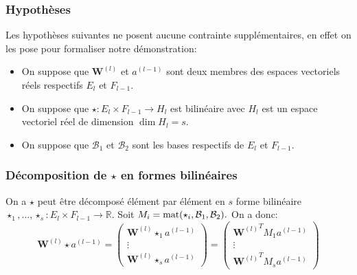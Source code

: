 \subsubsection{Hypothèses}
Les hypothèses suivantes ne posent aucune contrainte supplémentaires, en effet on les pose pour formaliser notre démonstration:
\begin{itemize}
\item On suppose que $\boldsymbol{W}^{(l)}$ et $a^{(l-1)}$ sont deux membres des espaces vectoriels réels respectifs $E_l$ et $F_{l-1}.$
\item On suppose que $\star : E_l\times F_{l-1}\rightarrow H_l$ est bilinéaire avec $H_l$ est un espace vectoriel réel de dimension $\dim H_l=s$.
\item On suppose que $\mathcal{B}_1$ et $\mathcal{B}_2$ sont les bases respectifs de  $E_l$ et $F_{l-1}.$
\end{itemize}
\subsubsection{Décomposition de $\star$ en formes bilinéaires}
On a $\star$ peut être décomposé élément par élément en $s$ forme bilinéaire $\star_1,\dots,\star_s:E_l\times F_{l-1} \rightarrow \mathbb{R}.$
\newline Soit $M_i=\operatorname{mat}(\star_i,\mathcal{B}_1,\mathcal{B}_2).$ On a donc:
\begin{equation*}
	\boldsymbol{W}^{(l)}\star a^{(l-1)} = \begin{pmatrix}
	\boldsymbol{W}^{(l)}\star_1 a^{(l-1)}	 \\
	\vdots \\
	\boldsymbol{W}^{(l)}\star_s a^{(l-1)}
		\end{pmatrix} =
	\begin{pmatrix}
		{\boldsymbol{W}^{(l)}}^T M_1 a^{(l-1)}	\\
		\vdots \\
		{\boldsymbol{W}^{(l)}}^T M_s  a^{(l-1)}
	\end{pmatrix} 
\end{equation*}
